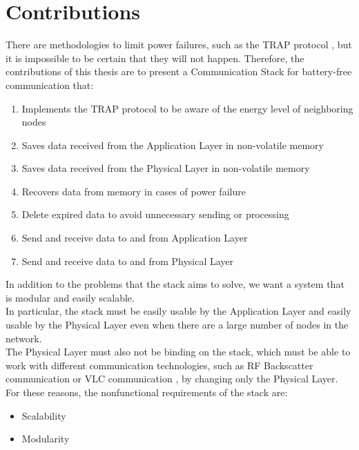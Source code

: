 \section{Contributions}
\label{sec:contributions}
There are methodologies to limit power failures, such as the TRAP protocol \cite{9733918}, but it is impossible to be certain that they will not happen. Therefore, the contributions of this thesis are to present a Communication Stack for battery-free communication that:
\begin{enumerate}
\item Implements the TRAP protocol \cite{9733918} to be aware of the energy level of neighboring nodes
\item Saves data received from the Application Layer in non-volatile memory
\item Saves data received from the Physical Layer in non-volatile memory
\item Recovers data from memory in cases of power failure
\item Delete expired data to avoid unnecessary sending or processing
\item Send and receive data to and from Application Layer
\item Send and receive data to and from Physical Layer
\end{enumerate}
In addition to the problems that the stack aims to solve, we want a system that is modular and easily scalable.\\
In particular, the stack must be easily usable by the Application Layer and easily usable by the Physical Layer even when there are a large number of nodes in the network.\\
The Physical Layer must also not be binding on the stack, which must be able to work with different communication technologies, such as RF Backscatter communication \cite{transientComp} or VLC communication \cite{VLCCOmm}, by changing only the Physical Layer.\\
For these reasons, the nonfunctional requirements of the stack are:
\begin{itemize}
    \item Scalability
    \item Modularity
\end{itemize}
  

\newpage
